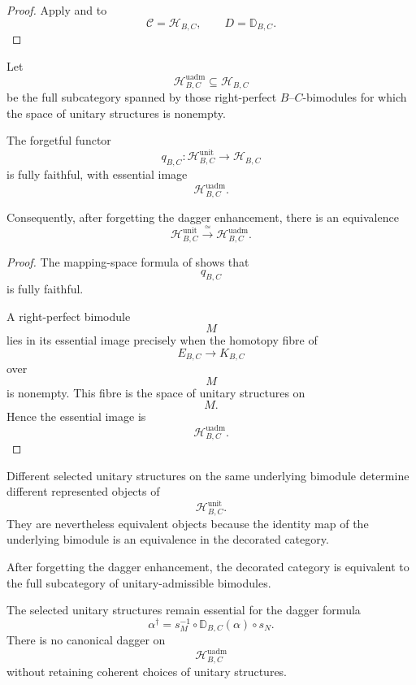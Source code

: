 \begin{proof}
Apply
and
to
\[
    \mathcal C
    =
    \mathcal H_{B,C},
    \qquad
    D
    =
    \mathbb D_{B,C}.
\]
\end{proof}

\begin{definition}
\label{def:unitary-admissible-bimodule}
Let
\[
    \mathcal H^{\mathrm{uadm}}_{B,C}
    \subseteq
    \mathcal H_{B,C}
\]
be the full subcategory spanned by those right-perfect
$B$--$C$-bimodules for which the space of unitary structures is
nonempty.
\end{definition}

\begin{proposition}
\label{prop:underlying-admissible-hom-category}
The forgetful functor
\[
    q_{B,C}
    \colon
    \mathcal H^{\mathrm{unit}}_{B,C}
    \longrightarrow
    \mathcal H_{B,C}
\]
is fully faithful, with essential image
\[
    \mathcal H^{\mathrm{uadm}}_{B,C}.
\]

Consequently, after forgetting the dagger enhancement, there is an
equivalence
\[
    \mathcal H^{\mathrm{unit}}_{B,C}
    \xrightarrow{\;\simeq\;}
    \mathcal H^{\mathrm{uadm}}_{B,C}.
\]
\end{proposition}

\begin{proof}
The mapping-space formula of
shows that
\[
    q_{B,C}
\]
is fully faithful.

A right-perfect bimodule
\[
    M
\]
lies in its essential image precisely when the homotopy fibre of
\[
    E_{B,C}
    \longrightarrow
    K_{B,C}
\]
over
\[
    M
\]
is nonempty. This fibre is the space of unitary structures on
\[
    M.
\]
Hence the essential image is
\[
    \mathcal H^{\mathrm{uadm}}_{B,C}.
\]
\end{proof}

\begin{remark}
\label{rem:selected-structures-underlying-category}
Different selected unitary structures on the same underlying bimodule
determine different represented objects of
\[
    \mathcal H^{\mathrm{unit}}_{B,C}.
\]
They are nevertheless equivalent objects because the identity map of
the underlying bimodule is an equivalence in the decorated category.

After forgetting the dagger enhancement, the decorated category is
equivalent to the full subcategory of unitary-admissible bimodules.

The selected unitary structures remain essential for the dagger formula
\[
    \alpha^\dagger
    =
    s_M^{-1}
    \circ
    \mathbb D_{B,C}(\alpha)
    \circ
    s_N.
\]
There is no canonical dagger on
\[
    \mathcal H^{\mathrm{uadm}}_{B,C}
\]
without retaining coherent choices of unitary structures.
\end{remark}


